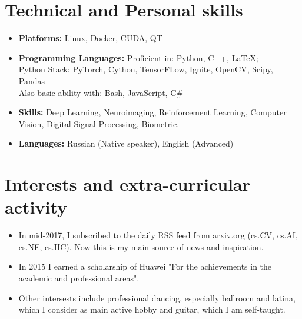 \documentclass[10pt,a4paper,sans]{moderncv}
\begin{document}
\section{Technical and Personal skills}

\vspace{6pt}

\begin{itemize}

\item \textbf{Platforms:} Linux, Docker, CUDA, QT
\vspace{2pt}
\item \textbf{Programming Languages:} Proficient in: Python, C++, \LaTeX;\\
Python Stack: PyTorch, Cython, TensorFLow, Ignite, OpenCV, Scipy, Pandas \\
Also basic ability with: Bash, JavaScript, C\#
\vspace{2pt}
\item \textbf{Skills:} Deep Learning, Neuroimaging, Reinforcement Learning, Computer Vision, Digital Signal Processing, Biometric.
\vspace{2pt}
\item \textbf{Languages:} Russian (Native speaker), English (Advanced)



\end{itemize}

\section{Interests and extra-curricular activity}

\vspace{6pt}

\begin{itemize}

\item{In mid-2017, I subscribed to the daily RSS feed from arxiv.org (cs.CV, cs.AI, cs.NE, cs.HC). Now this is my main source of news and inspiration.}
\vspace{2pt}
\item{In 2015 I earned a scholarship of Huawei "For the achievements in the academic and professional areas".}
\vspace{2pt}
\item{Other intersests include professional dancing, especially ballroom and latina, which I consider as main active hobby and guitar, which I am self-taught.}



\end{itemize}
\end{document}
